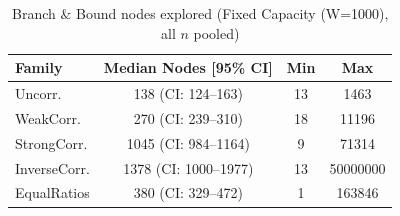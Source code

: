 \begin{table}[tb]
\centering
\caption{Branch $\&$ Bound nodes explored (Fixed Capacity (W=1000), all $n$ pooled)}
\label{tab:fixed-bb-nodes}
\begin{tabular}{lccc}
\toprule
Family & Median Nodes [95\% CI] & Min & Max \\
\midrule
Uncorr. & 138 (CI: 124–163) & 13 & 1463 \\
WeakCorr. & 270 (CI: 239–310) & 18 & 11196 \\
StrongCorr. & 1045 (CI: 984–1164) & 9 & 71314 \\
InverseCorr. & 1378 (CI: 1000–1977) & 13 & 50000000 \\
EqualRatios & 380 (CI: 329–472) & 1 & 163846 \\
\bottomrule
\end{tabular}
\end{table}
